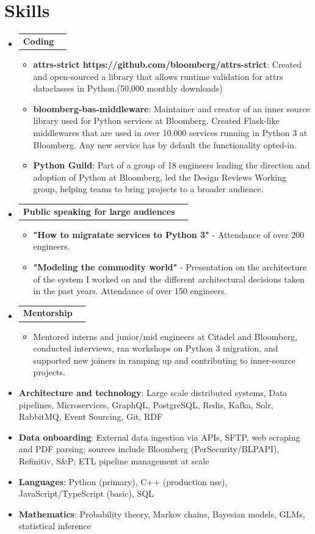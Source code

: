 \documentclass[letterpaper,11pt]{article}
\makeatletter
\newcommand{\resumeItem}[2]{
  \item\small{
    \textbf{#1}{: #2 \vspace{-2pt}}
  }
}
\newcommand{\workItem}[2]{
  \item\small{
    \textbf{#1}{#2 \vspace{-1.5pt}}
  }
}
\newcommand{\resumeCoding}[1]{
  \vspace{-2pt}\item
    \begin{tabular*}{0.97\textwidth}{l@{\extracolsep{\fill}}r}
      \textbf{#1} \\
    \end{tabular*}\vspace{-6pt}
}
\newcommand{\resumeSubHeadingListStart}{\begin{itemize}[leftmargin=*]}
\newcommand{\resumeSubHeadingListEnd}{\end{itemize}}
\newcommand{\resumeItemListStart}{\begin{itemize}}
\newcommand{\resumeItemListEnd}{\end{itemize}\vspace{-6pt}}
\makeatother
\begin{document}
\section{Skills}
 \resumeSubHeadingListStart
    \resumeCoding {Coding}
      \resumeItemListStart
        \resumeItem {attrs-strict https://github.com/bloomberg/attrs-strict}
        {Created and open-sourced a library that allows runtime validation for attrs dataclasses in Python.(50,000 monthly downloads)}
        \resumeItem {bloomberg-bas-middleware}
        {Maintainer and creator of an inner source library used for Python services at Bloomberg. Created Flask-like middlewares that are used in over 10.000 services running in Python 3 at Bloomberg. Any new service has by default the functionality opted-in.}
        \resumeItem {Python Guild}
        {Part of a group of 18 engineers leading the direction and adoption of Python at Bloomberg, led the Design Reviews Working group, helping teams to bring projects to a broader audience.}
      \resumeItemListEnd
    \resumeCoding {Public speaking for large audiences}
      \resumeItemListStart
        \workItem{}
        {\textbf{"How to migratate services to Python 3"} -  Attendance of over 200 engineers.}
        \workItem{}
        {\textbf{"Modeling the commodity world"} - Presentation on the architecture of the system I worked on and the different architectural decisions taken in the past years. Attendance of over 150 engineers.}
      \resumeItemListEnd
    \resumeCoding {Mentorship}
      \resumeItemListStart
        \workItem{}
        {Mentored interns and junior/mid engineers at Citadel and Bloomberg, conducted interviews, ran workshops on Python 3 migration, and supported new joiners in ramping up and contributing to inner-source projects.}
      \resumeItemListEnd
   \item{
     \textbf{Architecture and technology}{: Large scale distributed systems, Data pipelines, Microservices, GraphQL, PostgreSQL, Redis, Kafka, Solr, RabbitMQ, Event Sourcing, Git, RDF}
   }
   \item{
     \textbf{Data onboarding}{: External data ingestion via APIs, SFTP, web scraping and PDF parsing; sources include Bloomberg (PerSecurity/BLPAPI), Refinitiv, S\&P; ETL pipeline management at scale}
   }
   \item{
     \textbf{Languages}{: Python (primary), C++ (production use), JavaScript/TypeScript (basic), SQL}
   }
   \item{
     \textbf{Mathematics}{: Probability theory, Markov chains, Bayesian models, GLMs, statistical inference}
   }

 \resumeSubHeadingListEnd
\end{document}

